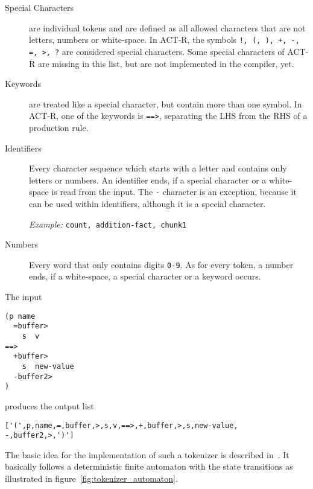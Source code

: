 \begin{description}
 \item[Special Characters] are individual tokens and are defined as all allowed characters that are not letters, numbers or white-space. In ACT-R, the symbols \lstinline|!, (, ), +, -, =, >, ?| are considered special characters. Some special characters of ACT-R are missing in this list, but are not implemented in the compiler, yet.
 \item[Keywords] are treated like a special character, but contain more than one symbol. In ACT-R, one of the keywords is \lstinline|==>|, separating the LHS from the RHS of a production rule.
 \item[Identifiers] Every character sequence which starts with a letter and contains only letters or numbers. An identifier ends, if a special character or a white-space is read from the input. The \lstinline|-| character is an exception, because it can be used within identifiers, although it is a special character.
 
 \emph{Example:} \lstinline|count, addition-fact, chunk1|
 \item[Numbers] Every word that only contains digits \lstinline|0-9|. As for every token, a number ends, if a white-space, a special character or a keyword occurs.
\end{description}

\begin{example}
The input 

\begin{lstlisting}
(p name
  =buffer>
    s  v
==>
  +buffer>
    s  new-value
  -buffer2>
)
\end{lstlisting}

produces the output list

\begin{lstlisting}
['(',p,name,=,buffer,>,s,v,==>,+,buffer,>,s,new-value, -,buffer2,>,')']
\end{lstlisting}
\end{example}

The basic idea for the implementation of such a tokenizer is described in~\cite[19\psqq]{prolog_tokenizer}. It basically follows a deterministic finite automaton with the state transitions as illustrated in figure~\ref{fig:tokenizer_automaton}.

